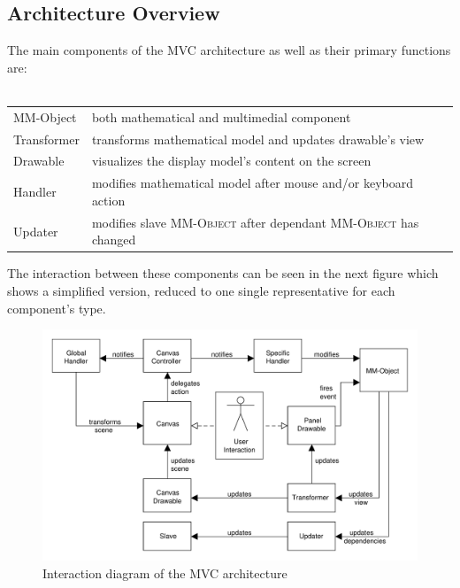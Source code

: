 \documentclass[a4paper,12pt]{article}
\newcommand{\name}[1]{\textsc{#1}}
\newcommand{\mmo}{\name{MM-Object }}
\begin{document}
\newpage

\subsection{Architecture Overview}

The main components of the MVC architecture as well as their primary functions are:\\
\\
\begin{tabular}{ll}
  MM-Object & both mathematical and multimedial component \\
  Transformer & transforms mathematical model and updates drawable's view \\
  Drawable & visualizes the display model's content on the screen \\
  Handler & modifies mathematical model after mouse and/or keyboard action \\
  Updater & modifies slave \mmo after dependant \mmo has changed \\
\end{tabular}

\vspace{0.5cm}

The interaction between these components can be seen in the next figure which shows a simplified version,
reduced to one single representative for each component's type.

\begin{figure}[h]
  \begin{center}
    \includegraphics[width=14cm]
      {images/mvc.pdf}
    \caption{Interaction diagram of the MVC architecture}
    \label{img:mvc}
  \end{center}
\end{figure}
\end{document}
